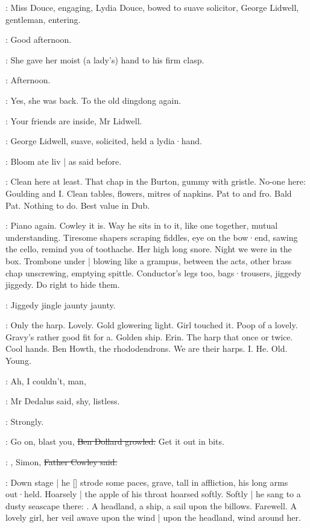 :
Miss Douce,
engaging,
Lydia Douce,
bowed to suave solicitor,
George Lidwell,
gentleman,
entering.

\lidwell:
Good afternoon.

:
She gave her moist (a lady's) hand to his firm clasp.

\MissD:
Afternoon.

:
Yes,
she was back.
To the old dingdong again.

\MissD:
Your friends are inside,
Mr Lidwell.

:
George Lidwell,
suave,
solicited,
held a lydia·hand.

:
Bloom ate liv |
as said before.

\BloomInt:
Clean here at least.
That chap in the Burton,
gummy with gristle.
No-one here:
Goulding and I\@.
Clean tables,
flowers,
mitres of napkins.
Pat to and fro.
Bald Pat.
Nothing to do.
Best value in Dub.

\BloomInt:
Piano again.
Cowley it is.
Way he sits in to it,
like one together,
mutual understanding.
Tiresome shapers scraping fiddles,
eye on the bow·end,
sawing the cello,
remind you of toothache.
Her high long snore.
Night we were in the box.
Trombone under |
blowing like a grampus,
between the acts,
other brass chap unscrewing,
emptying spittle.
Conductor's legs too,
bags·trousers,
jiggedy jiggedy.
Do right to hide them.

:
Jiggedy jingle jaunty jaunty.

\BloomInt:
Only the harp.
Lovely.
Gold glowering light.
Girl touched it.
Poop of a lovely.
Gravy's rather good fit for a.
Golden ship.
Erin.
The harp that
once or twice.
Cool hands.
Ben Howth,
the rhododendrons.
We are their harps.
I\@.
He.
Old.
Young.

\simon:
Ah,
I couldn't,
man,

:
Mr Dedalus said,
shy,
listless.

:
Strongly.

\dollard:
Go on,
blast you,
\sout{Ben Dollard growled.}
Get it out in bits.

\cowley:
,
Simon,
\sout{Father Cowley said.}

:
Down stage |
he [] strode some paces,
grave,
tall in affliction,
his long arms out·held.
Hoarsely |
the apple of his throat hoarsed softly.
Softly |
he sang to a dusty seascape there:
.
A headland,
a ship,
a sail upon the billows.
Farewell.
A lovely girl,
her veil awave upon the wind |
upon the headland,
wind around her.

